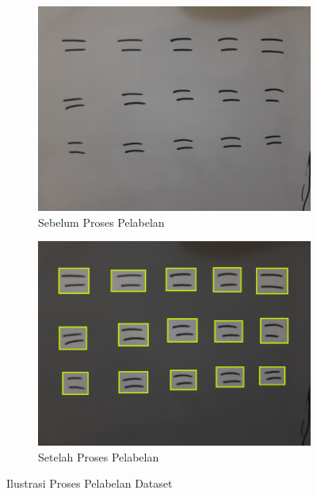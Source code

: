 \begin{figure}[H]
    \begin{subfigure}{.5\textwidth}
      \centering
      \captionsetup{width=.8\linewidth}
      \includegraphics[width=.88\linewidth]{gambar/label_before.jpg}
      \caption{Sebelum Proses Pelabelan}
      \label{fig:labelbefore}
    \end{subfigure}%
    \begin{subfigure}{.5\textwidth}
      \centering
      \captionsetup{width=.8\linewidth}
      \includegraphics[width=.88\linewidth]{gambar/label_after.png}
      \caption{Setelah Proses Pelabelan}
      \label{fig:labelafter}
    \end{subfigure}
    \caption{Ilustrasi Proses Pelabelan Dataset}
    \label{fig:ilustrasipelabelan}
  \end{figure}

